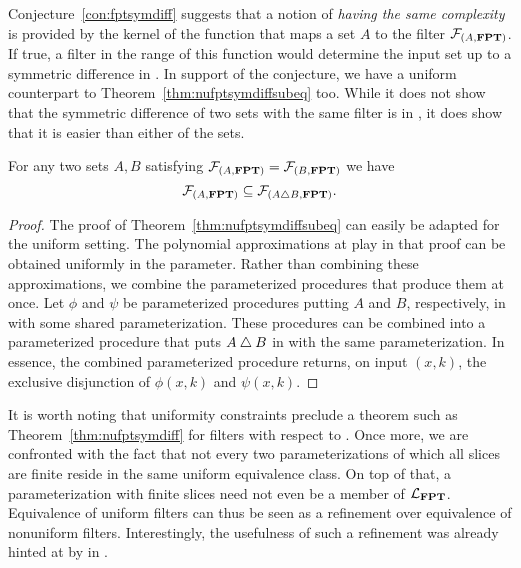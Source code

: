 Conjecture~\ref{con:fptsymdiff} suggests that a notion of \emph{having the same complexity} is provided by the kernel of the function that maps a set $A$ to the filter $\mathcal{F}_{(A, \textnormal{\textbf{FPT}})}$.
If true, a filter in the range of this function would determine the input set up to a symmetric difference in .
In support of the conjecture, we have a uniform counterpart to Theorem~\ref{thm:nufptsymdiffsubeq} too.
While it does not show that the symmetric difference of two sets with the same filter is in , it does show that it is easier than either of the sets.
\begin{theorem}
  For any two sets $A, B$ satisfying $\mathcal{F}_{(A, \textnormal{\textbf{FPT}})} = \mathcal{F}_{(B, \textnormal{\textbf{FPT}})}$ we have
  \begin{equation*}
    \mathcal{F}_{(A, \textnormal{\textbf{FPT}})} \subseteq \mathcal{F}_{(A \bigtriangleup B, \textnormal{\textbf{FPT}})}.
  \end{equation*}
\end{theorem}
\begin{proof}
  The proof of Theorem~\ref{thm:nufptsymdiffsubeq} can easily be adapted for the uniform setting.
  The polynomial approximations at play in that proof can be obtained uniformly in the parameter.
  Rather than combining these approximations, we combine the parameterized procedures that produce them at once.
  Let $\phi$ and $\psi$ be parameterized procedures putting $A$ and $B$, respectively, in  with some shared parameterization.
  These procedures can be combined into a parameterized procedure that puts $A \bigtriangleup B$ in  with the same parameterization.
  In essence, the combined parameterized procedure returns, on input $(x, k)$, the exclusive disjunction of $\phi(x, k)$ and $\psi(x, k)$.
\end{proof}

It is worth noting that uniformity constraints preclude a theorem such as Theorem~\ref{thm:nufptsymdiff} for filters with respect to .
Once more, we are confronted with the fact that not every two parameterizations of which all slices are finite reside in the same uniform equivalence class.
On top of that, a parameterization with finite slices need not even be a member of $\mathcal{L}_{\textnormal{\textbf{FPT}}}$.
Equivalence of uniform filters can thus be seen as a refinement over equivalence of nonuniform filters.
Interestingly, the usefulness of such a refinement was already hinted at by \textcite{orponen1986classification} in \citeyear{orponen1986classification}.

